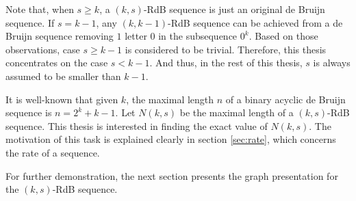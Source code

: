 Note that, when $s\geq k$, a $(k,s)$-RdB sequence is just an original de Bruijn sequence. If $s=k-1$, any $(k,k-1)$-RdB sequence can be achieved from a de Bruijn sequence removing $1$ letter $0$ in the subsequence $0^k$. Based on those observations, case $s\geq k-1$ is considered to be trivial. Therefore, this thesis concentrates on the case $s<k-1$. And thus, in the rest of this thesis, $s$ is always assumed to be smaller than $k-1$.

It is well-known that given $k$, the maximal length $n$ of a binary acyclic de Bruijn sequence is $n=2^{k}+k-1$. Let $N(k,s)$ be the maximal length of a $(k,s)$-RdB sequence. This thesis is interested in finding the exact value of $N(k,s)$. The motivation of this task is explained clearly in section \ref{sec:rate}, which concerns the rate of a sequence. 

For further demonstration, the next section presents the graph presentation for the $(k,s)$-RdB sequence.